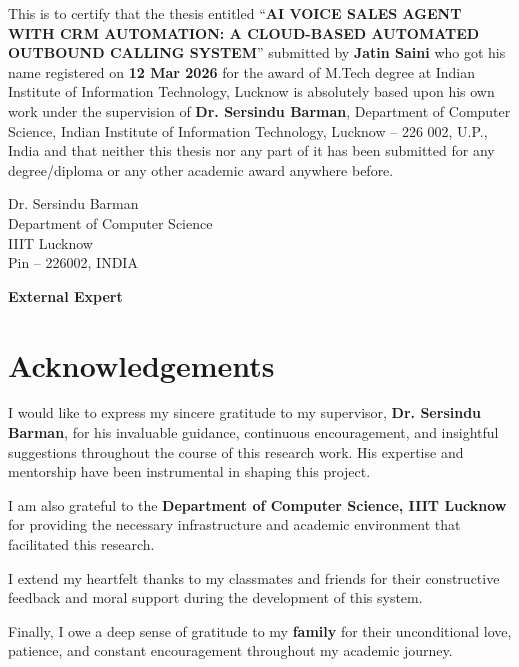 \documentclass[12pt,a4paper,oneside]{book}
\begin{document}
This is to certify that the thesis entitled ``\textbf{AI VOICE SALES AGENT WITH CRM AUTOMATION: A CLOUD-BASED AUTOMATED OUTBOUND CALLING SYSTEM}'' submitted by \textbf{Jatin Saini} who got his name registered on \textbf{12 Mar 2026} for the award of M.Tech degree at Indian Institute of Information Technology, Lucknow is absolutely based upon his own work under the supervision of \textbf{Dr. Sersindu Barman}, Department of Computer Science, Indian Institute of Information Technology, Lucknow -- 226 002, U.P., India and that neither this thesis nor any part of it has been submitted for any degree/diploma or any other academic award anywhere before.

\vspace{4cm}

\noindent
\begin{minipage}[t]{0.45\textwidth}
Dr. Sersindu Barman\\
Department of Computer Science\\
IIIT Lucknow\\
Pin -- 226002, INDIA
\end{minipage}
\hfill

\vspace{3cm}

\noindent\textbf{External Expert}

\newpage\thispagestyle{empty}\mbox{}\newpage

\chapter*{Acknowledgements}

I would like to express my sincere gratitude to my supervisor, \textbf{Dr. Sersindu Barman}, for his invaluable guidance, continuous encouragement, and insightful suggestions throughout the course of this research work. His expertise and mentorship have been instrumental in shaping this project.

I am also grateful to the \textbf{Department of Computer Science, IIIT Lucknow} for providing the necessary infrastructure and academic environment that facilitated this research.

I extend my heartfelt thanks to my classmates and friends for their constructive feedback and moral support during the development of this system.

Finally, I owe a deep sense of gratitude to my \textbf{family} for their unconditional love, patience, and constant encouragement throughout my academic journey.
\end{document}
